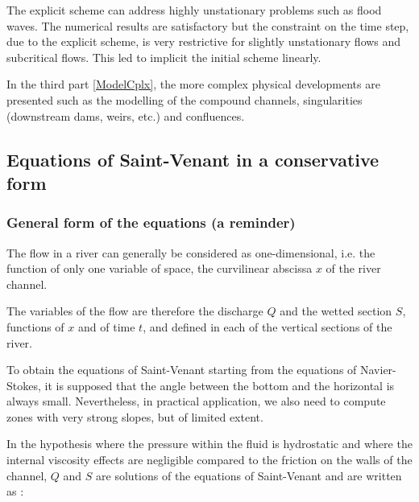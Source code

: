 \vspace{0.5cm}

The explicit scheme can address highly unstationary problems such as flood waves. The numerical results are satisfactory but the constraint on the time step, due to the explicit scheme, is very restrictive for slightly unstationary flows and subcritical flows. This led to implicit the initial scheme linearly.

\vspace{0.5cm}

In the third part \ref{ModelCplx}, the more complex physical developments are presented such as the modelling of the compound channels, singularities (downstream dams, weirs, etc.) and confluences.

\subsection{Equations of Saint-Venant in a conservative form}

\label{ESVTcons}

\subsubsection{General form of the equations (a reminder)}

The flow in a river can generally be considered as one-dimensional, i.e. the function of only one variable of space, the curvilinear abscissa $x$ of the river channel.

\vspace{0.5cm}

The variables of the flow are therefore the discharge $Q$ and the wetted section $S$, functions of $x$ and of time $t$, and defined in each of the vertical sections of the river. 

To obtain the equations of Saint-Venant starting from the equations of Navier-Stokes, it is supposed that the angle between the bottom and the horizontal is always small. Nevertheless, in practical application, we also need to compute zones with very strong slopes, but of limited extent.

\vspace{0.5cm}

In the hypothesis where the pressure within the fluid is hydrostatic and where the internal viscosity effects are negligible compared to the friction on the walls of the channel, $Q$ and $S$ are solutions of the equations of Saint-Venant and are written as \cite{GOUTAL91} \cite{AFIF86} :

